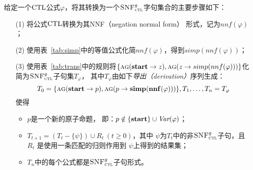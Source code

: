 给定一个$\textrm{CTL}$公式$\varphi$，将其转换为一个${\textsc{SNF}_{\textsc{ctl}}^g}$字句集合的主要步骤如下：
\begin{itemize}
	\item[(1)]  将公式$\textrm{CTL}$转换为其NNF（negation normal form）
	形式，记为$nnf(\varphi)$；
	\item[(2)]  使用表~\ref{tab:simp}中的等值公式化简$nnf(\varphi)$，得到$simp(nnf(\varphi))$；
	\item[(3)] 使用表~\ref{tab:trans}中的规则将$\{\textsc{a}\textsc{g}(\textbf{start}\rightarrow z), \textsc{a}\textsc{g}(z \rightarrow simp(nnf(\varphi)))\}$化简为${\textsc{SNF}_{\textsc{ctl}}^g}$子句集$T_{\varphi}$，
	其中$T_\varphi$由如下\emph{导出（derivation）}序列生成：
	\[ T_0=\{\textsc{a}\textsc{g}(\textbf{start}\rightarrow p), \textsc{a}\textsc{g}(p\rightarrow {\bf simp}({\bf nnf}(\varphi)))\}, T_1, \ldots, T_n=T_\varphi\]
	使得
	\begin{itemize}
		\item $p$是一个新的原子命题， 即：$p\notin \{\textbf{start}\}\cup\textit{Var}(\varphi)$；
		\item $T_{t+1} = (T_t - \{\psi\}) \cup R_t~(t\ge 0)$，其中 $\psi$为$T_t$中的非${\textsc{SNF}_{\textsc{ctl}}^g}$子句，且 $R_t$
	是使用一条匹配的归则作用到 $\psi$上得到的结果集；
		\item  $T_n$中的每个公式都是${\textsc{SNF}_{\textsc{ctl}}^g}$子句形式。
	\end{itemize}
\end{itemize}


